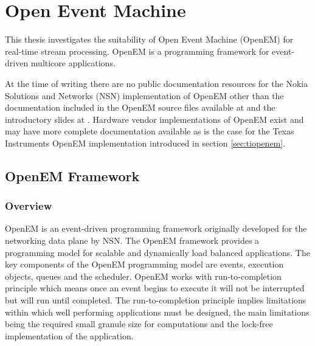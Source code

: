 \chapter{Open Event Machine}
\label{chapter:openem}
This thesis investigates the suitability of Open Event Machine (OpenEM) for
real-time stream processing. OpenEM is a programming framework for event-driven
multicore applications.

At the time of writing there are no public documentation resources for the Nokia
Solutions and Networks (NSN) implementation of OpenEM other than the
documentation included in the OpenEM source files available at \cite{openempage}
and the introductory slides at \cite{openemintro}. Hardware vendor
implementations of OpenEM exist and may have more complete documentation
available as is the case for the Texas Instruments OpenEM implementation
introduced in section \ref{sec:tiopenem}.

\section{OpenEM Framework}
\label{sec:emframework}
\subsection{Overview}
OpenEM is an event-driven programming framework originally developed for the
networking data plane by NSN. The OpenEM framework provides a programming model
for scalable and dynamically load balanced applications. The key components of
the OpenEM programming model are events, execution objects, queues and the
scheduler. OpenEM works with run-to-completion principle which means once an
event begins to execute it will not be interrupted but will run until completed.
The run-to-completion principle implies limitations within which well performing
applications must be designed, the main limitations being the required small
granule size for computations and the lock-free implementation of the
application. \cite{openempage}

